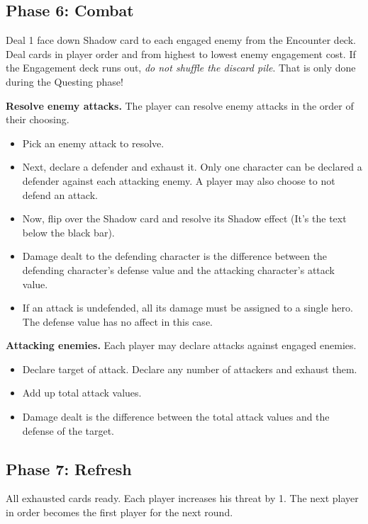 \documentclass[12pt]{article}
\newenvironment{itemizeCustom}
{\begin{itemize}
  \setlength{\itemsep}{1pt}
  \setlength{\parskip}{0pt}
  \setlength{\parsep}{0pt}}
{\end{itemize}}
\begin{document}
\begin{multicols*}{2}
\subsection*{Phase 6: Combat}
Deal 1 face down Shadow card to each engaged enemy from the Encounter deck. Deal cards in player order and from highest to lowest enemy engagement cost. If the Engagement deck runs out, \emph{do not shuffle the discard pile}. That is only done during the Questing phase!

\noindent
\textbf{Resolve enemy attacks.} The player can resolve enemy attacks in the order of their choosing. 
\begin{itemizeCustom}
	\item Pick an enemy attack to resolve.
	\item Next, declare a defender and exhaust it. Only one character can be declared a defender against each attacking enemy. A player may also choose to not defend an attack. 
	\item Now, flip over the Shadow card and resolve its Shadow effect (It's the text below the black bar). 
	\item Damage dealt to the defending character is the difference between the defending character's defense value and the attacking character's attack value.
	\item If an attack is undefended, all its damage must be assigned to a single hero. The defense value has no affect in this case.
\end{itemizeCustom}

\noindent
\textbf{Attacking enemies.} Each player may declare attacks against engaged enemies. 
\begin{itemizeCustom}
	\item Declare target of attack. Declare any number of attackers and exhaust them.
	\item Add up total attack values.
	\item Damage dealt is the difference between the total attack values and the defense of the target.
\end{itemizeCustom}

\subsection*{Phase 7: Refresh}
All exhausted cards ready. Each player increases his threat by 1. The next player in order becomes the first player for the next round. 


\end{multicols*}
\end{document}
